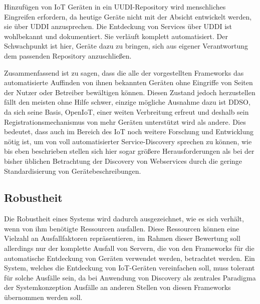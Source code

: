 \documentclass[conference,compsoc]{IEEEtran}
\begin{document}
Hinzufügen von IoT Geräten in ein UUDI-Repository wird menschliches Eingreifen erfordern, da heutige Geräte nicht mit der Absicht entwickelt werden, sie über UDDI anzusprechen. Die Entdeckung von Services über UDDI ist wohlbekannt und dokumentiert. Sie verläuft komplett automatisiert. Der Schwachpunkt ist hier, Geräte dazu zu bringen, sich aus eigener Verantwortung dem passenden Repository anzuschließen.

Zusammenfassend ist zu sagen, dass die alle der vorgestellten Frameworks das automatisierte Auffinden von ihnen bekannten Geräten ohne Eingriffe von Seiten der Nutzer oder Betreiber bewältigen können. Diesen Zustand jedoch herzustellen fällt den meisten ohne Hilfe schwer, einzige mögliche Ausnahme dazu ist DDSO, da sich seine Basis, OpenIoT, einer weiten Verbreitung erfreut und deshalb sein Registrationsmechanismus von mehr Geräten unterstützt wird als andere. Dies bedeutet, dass auch im Bereich des IoT noch weitere Forschung und Entwicklung nötig ist, um von voll automatisierter Service-Discovery sprechen zu können, wie bis eben beschrieben stellen sich hier sogar größere Herausforderungen als bei der bisher üblichen Betrachtung der Discovery von Webservices durch die geringe Standardisierung von Gerätebeschreibungen.

\subsection{Robustheit}

Die Robustheit eines Systems wird dadurch ausgezeichnet, wie es sich verhält, wenn von ihm benötigte Ressourcen ausfallen. Diese Ressourcen können eine Vielzahl an Ausfallfaktoren repräsentieren, im Rahmen dieser Bewertung soll allerdings nur der komplette Ausfall von Servern, die von den Frameworks für die automatische Entdeckung von Geräten verwendet werden, betrachtet werden. Ein System, welches die Entdeckung von IoT-Geräten vereinfachen soll, muss tolerant für solche Ausfälle sein, da bei Anwendung von Discovery als zentrales Paradigma der Systemkonzeption Ausfälle an anderen Stellen von diesen Frameworks übernommen werden soll.
\end{document}
